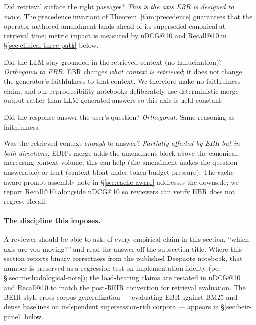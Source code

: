 \documentclass[runningheads]{llncs}
\begin{document}
\begin{description}[leftmargin=1.5em,style=nextline]
  \item[\textbf{Context Relevance.}] Did retrieval surface the right
        passages? \emph{This is the axis EBR is designed to move.} The
        precedence invariant of Theorem~\ref{thm:precedence} guarantees
        that the operator-authored amendment lands ahead of its
        superseded canonical at retrieval time; metric impact is
        measured by nDCG@10 and Recall@10 in
        \S\ref{sec:clinical-three-path} below.
  \item[\textbf{Faithfulness.}] Did the LLM stay grounded in the
        retrieved context (no hallucination)? \emph{Orthogonal to EBR.}
        EBR changes \emph{what context is retrieved}; it does not
        change the generator's faithfulness to that context. We
        therefore make no faithfulness claim, and our reproducibility
        notebooks deliberately use deterministic merge output rather
        than LLM-generated answers so this axis is held constant.
  \item[\textbf{Answer Relevance.}] Did the response answer the user's
        question? \emph{Orthogonal.} Same reasoning as faithfulness.
  \item[\textbf{Context Sufficiency.}] Was the retrieved context
        \emph{enough} to answer? \emph{Partially affected by EBR but
        in both directions.} EBR's merge adds the amendment block above
        the canonical, increasing context volume; this can help (the
        amendment makes the question answerable) or hurt (context
        bloat under token budget pressure). The cache-aware prompt
        assembly note in \S\ref{sec:cache-aware} addresses the
        downside; we report Recall@10 alongside nDCG@10 so reviewers
        can verify EBR does not regress Recall.
\end{description}

\paragraph{The discipline this imposes.} A reviewer should be able to
ask, of every empirical claim in this section, ``which axis are you
moving?'' and read the answer off the subsection title. Where this
section reports binary correctness from the published Deepnote
notebook, that number is preserved as a regression test on
implementation fidelity (per \S\ref{sec:methodological-note}); the
load-bearing claims are restated in nDCG@10 and Recall@10 to match the
post-BEIR \cite{thakur2021beir} convention for retrieval evaluation.
The BEIR-style cross-corpus generalization --- evaluating EBR
against BM25 and dense baselines on independent supersession-rich
corpora --- appears in \S\ref{sec:beir-panel} below.
\end{document}
